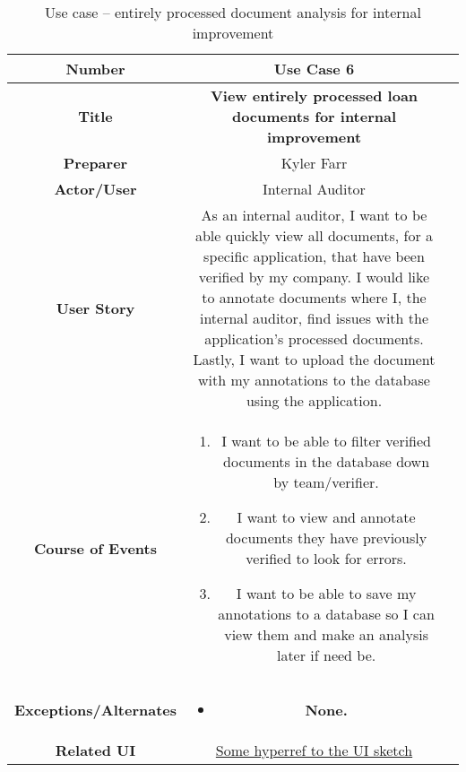 \begin{table}[H]
    \centering
    \begin{tabularx}{0.75\linewidth}{||Sc|X||}
        \hline
        \hline
        \textbf{Number} & \textbf{Use Case 6} \\
        \hline
        \textbf{Title} & \textbf{View entirely processed loan documents for internal improvement} \\
        \hline
        \textbf{Preparer} & Kyler Farr \\
        \hline
        \textbf{Actor/User} & Internal Auditor \\
        \hline
        \textbf{User Story} &
        As an internal auditor, I want to be able quickly view all documents, for a specific application, that have been verified by my company. I would like to annotate documents where I, the internal auditor, find issues with the application's processed documents. Lastly, I want to upload the document with my annotations to the database using the application. \\
        \hline
        \textbf{Course of Events} &
        \begin{minipage}[l]{\linewidth}
            \begin{enumerate}[wide, labelindent=0pt]
                \item I want to be able to filter verified documents in the database down by team/verifier.
                \item I want to view and annotate documents they have previously verified to look for errors.
                \item I want to be able to save my annotations to a database so I can view them and make an analysis later if need be.
            \end{enumerate}
            \vspace{4pt}
        \end{minipage} \\
        \hline
        \textbf{Exceptions/Alternates} & 
        \begin{minipage}[l]{\linewidth}
            \vspace{2pt}
            \begin{itemize}[wide, labelindent=0pt]
                \item \textbf{None.}
            \end{itemize}
        \end{minipage} \\
        \hline
        \textbf{Related UI} & \hyperref[templatesec]{Some hyperref to the UI sketch} \\
        \hline
        \hline
    \end{tabularx}
    \caption{Use case -- entirely processed document analysis for internal improvement}
    \label{tab:use_case_internal}
\end{table}